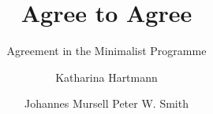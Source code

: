 \title{Agree  to  Agree}
\subtitle{Agreement  in  the  Minimalist  Programme}  
\author{Katharina  Hartmann \and Johannes  Mursell  \lastand  Peter  W.  Smith}
\renewcommand{\lsISBNdigital}{000-0-000000-00-0}
\renewcommand{\lsISBNhardcover}{000-0-000000-00-0} 
\renewcommand{\lsSeries}{ogs}  
\renewcommand{\lsSeriesNumber}{000} 
\newcommand{\lsID}{165} 
